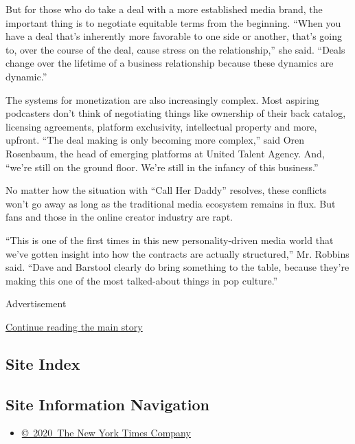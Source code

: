 But for those who do take a deal with a more established media brand,
the important thing is to negotiate equitable terms from the beginning.
``When you have a deal that's inherently more favorable to one side or
another, that's going to, over the course of the deal, cause stress on
the relationship,'' she said. ``Deals change over the lifetime of a
business relationship because these dynamics are dynamic.''

The systems for monetization are also increasingly complex. Most
aspiring podcasters don't think of negotiating things like ownership of
their back catalog, licensing agreements, platform exclusivity,
intellectual property and more, upfront. ``The deal making is only
becoming more complex,'' said Oren Rosenbaum, the head of emerging
platforms at United Talent Agency. And, ``we're still on the ground
floor. We're still in the infancy of this business.''

No matter how the situation with ``Call Her Daddy'' resolves, these
conflicts won't go away as long as the traditional media ecosystem
remains in flux. But fans and those in the online creator industry are
rapt.

``This is one of the first times in this new personality-driven media
world that we've gotten insight into how the contracts are actually
structured,'' Mr. Robbins said. ``Dave and Barstool clearly do bring
something to the table, because they're making this one of the most
talked-about things in pop culture.''

Advertisement

\protect\hyperlink{after-bottom}{Continue reading the main story}

\hypertarget{site-index}{%
\subsection{Site Index}\label{site-index}}

\hypertarget{site-information-navigation}{%
\subsection{Site Information
Navigation}\label{site-information-navigation}}

\begin{itemize}
\tightlist
\item
  \href{https://help.nytimes3xbfgragh.onion/hc/en-us/articles/115014792127-Copyright-notice}{©~2020~The
  New York Times Company}
\end{itemize}

